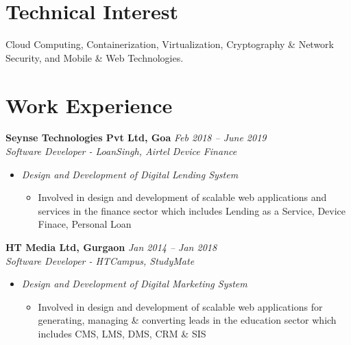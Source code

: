 \documentclass[margin,line]{resume}
\begin{document}
\begin{resume}
     \section{\mysidestyle Technical Interest}
        Cloud Computing, Containerization, Virtualization, Cryptography \& Network Security, and Mobile \& Web Technologies.

    \section{\mysidestyle Work Experience}

    \textbf{Seynse Technologies Pvt Ltd, Goa} \hfill \textsl{Feb 2018 -- June 2019} \vspace{0mm}\\\vspace{0mm}%
           \textsl{Software Developer - LoanSingh, Airtel Device Finance}\\
    \begin{itemize}
    
     \item \textsl{Design and Development of Digital Lending System}
        \begin{itemize}
            \item Involved in design and development of scalable web applications and services in the finance sector which includes
            Lending as a Service, Device Finace, Personal Loan
        \end{itemize}
    \end{itemize}

    \textbf{HT Media Ltd, Gurgaon} \hfill \textsl{Jan 2014 -- Jan 2018} \vspace{0mm}\\\vspace{0mm}%
           \textsl{Software Developer - HTCampus, StudyMate}\\
    \begin{itemize}
    
     \item \textsl{Design and Development of Digital Marketing System}
        \begin{itemize}
            \item Involved in design and development of scalable web applications for generating, managing \& converting leads
            in the education sector which includes CMS, LMS, DMS, CRM \& SIS
        \end{itemize}
   \end{itemize}


\end{resume}
\end{document}
